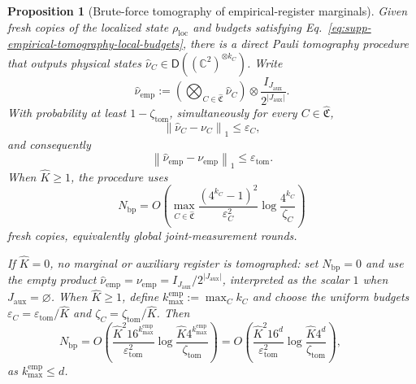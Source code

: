 \documentclass[
  aps,
  prx,
  reprint,
  superscriptaddress,
  amsmath,
  amssymb,
  nofootinbib,
  longbibliography
]{revtex4-2}
\newtheorem{proposition}[theorem]{Proposition}
\newcommand{\D}{\mathsf{D}}
\begin{document}
\begin{proposition}[Brute-force tomography of empirical-register marginals]
\label{prop:supp-block-product-bruteforce-tomography}
Given fresh copies of the localized state $\rho_{\mathrm{loc}}$ and budgets satisfying
Eq.~\eqref{eq:supp-empirical-tomography-local-budgets}, there is a direct
Pauli tomography procedure that outputs physical states
$\widehat\nu_C\in\D((\mathbb C^2)^{\otimes k_C})$.  Write
\begin{equation}
\widehat\nu_{\mathrm{emp}}
:=
\left(
\bigotimes_{C\in\widehat{\mathfrak C}}\widehat\nu_C
\right)
\otimes
\frac{I_{J_{\mathrm{aux}}}}{2^{|J_{\mathrm{aux}}|}}.
\end{equation}
With probability at least $1-\zeta_{\mathrm{tom}}$, simultaneously for
every $C\in\widehat{\mathfrak C}$,
\begin{equation}
\left\|
\widehat\nu_C-\nu_C
\right\|_1
\le
\varepsilon_C,
\end{equation}
and consequently
\begin{equation}
\left\|
\widehat\nu_{\mathrm{emp}}-\nu_{\mathrm{emp}}
\right\|_1
\le
\varepsilon_{\mathrm{tom}}.
\label{eq:supp-block-product-tomography-error}
\end{equation}
When $\widehat K\ge1$, the procedure uses
\begin{equation}
N_{\mathrm{bp}}
=
O\!\left(
\displaystyle
\max_{C\in\widehat{\mathfrak C}}
\frac{(4^{k_C}-1)^2}{\varepsilon_C^2}
\log\frac{4^{k_C}}{\zeta_C}
\right)
\label{eq:supp-block-product-tomography-general-cost}
\end{equation}
fresh copies, equivalently global joint-measurement rounds.

If $\widehat K=0$, no marginal or auxiliary register is tomographed:
set $N_{\mathrm{bp}}=0$ and use the empty product
$\widehat\nu_{\mathrm{emp}}=\nu_{\mathrm{emp}}
=I_{J_{\mathrm{aux}}}/2^{|J_{\mathrm{aux}}|}$, interpreted as the scalar
$1$ when $J_{\mathrm{aux}}=\varnothing$.  When $\widehat K\ge1$, define
$k_{\max}^{\mathrm{emp}}:=\max_C k_C$ and choose the uniform budgets
$\varepsilon_C=\varepsilon_{\mathrm{tom}}/\widehat K$ and
$\zeta_C=\zeta_{\mathrm{tom}}/\widehat K$.  Then
\begin{equation}
N_{\mathrm{bp}}
=
O\!\left(
\frac{\widehat K^2 16^{k_{\max}^{\mathrm{emp}}}}
{\varepsilon_{\mathrm{tom}}^2}
\log\frac{\widehat K4^{k_{\max}^{\mathrm{emp}}}}
{\zeta_{\mathrm{tom}}}
\right)
=O\!\left(
\frac{\widehat K^2 16^d}
{\varepsilon_{\mathrm{tom}}^2}
\log\frac{\widehat K4^d}{\zeta_{\mathrm{tom}}}
\right), 
\qquad
\label{eq:supp-block-product-tomography-max-block-cost}
\end{equation}
as $k_{\max}^{\mathrm{emp}}\le d$. 
\end{proposition}
\end{document}
